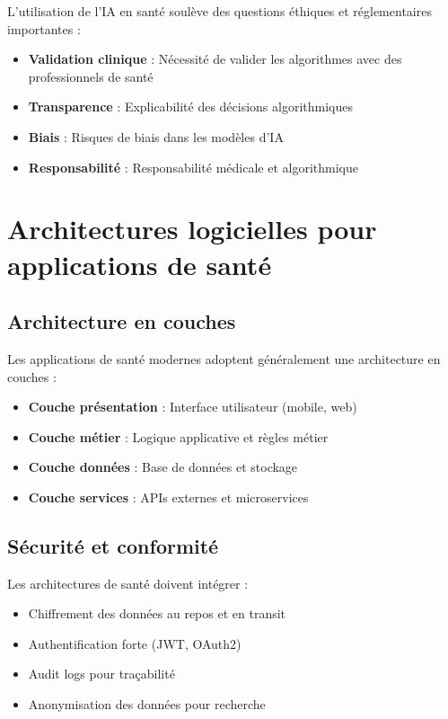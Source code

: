 \documentclass[a4paper,11pt]{report}
\begin{document}
L'utilisation de l'IA en santé soulève des questions éthiques et réglementaires importantes :

\begin{itemize}
    \item \textbf{Validation clinique} : Nécessité de valider les algorithmes avec des professionnels de santé
    \item \textbf{Transparence} : Explicabilité des décisions algorithmiques
    \item \textbf{Biais} : Risques de biais dans les modèles d'IA
    \item \textbf{Responsabilité} : Responsabilité médicale et algorithmique
\end{itemize}

\section{Architectures logicielles pour applications de santé}

\subsection{Architecture en couches}

Les applications de santé modernes adoptent généralement une architecture en couches :

\begin{itemize}
    \item \textbf{Couche présentation} : Interface utilisateur (mobile, web)
    \item \textbf{Couche métier} : Logique applicative et règles métier
    \item \textbf{Couche données} : Base de données et stockage
    \item \textbf{Couche services} : APIs externes et microservices
\end{itemize}

\subsection{Sécurité et conformité}

Les architectures de santé doivent intégrer :

\begin{itemize}
    \item Chiffrement des données au repos et en transit
    \item Authentification forte (JWT, OAuth2)
    \item Audit logs pour traçabilité
    \item Anonymisation des données pour recherche
\end{itemize}
\end{document}
